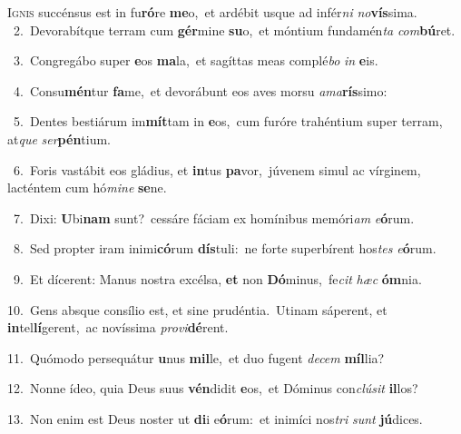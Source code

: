 \lettrine{\initial\textcolor{\initialcolor}{I}}{gnis} succénsus est in fu\-\textbf{ró}\-re \textbf{me}\-o,~\star et ardébit usque ad infér\textit{ni} \textit{no}\-\textbf{vís}sima.\\
{\numbfont\textcolor{\numbcolor}{~2.}}~Devorabítque terram cum \textbf{gér}\-mine \textbf{su}\-o,~\star et móntium fundamén\textit{ta} \textit{com}\-\textbf{bú}ret.\par
{\numbfont\textcolor{\numbcolor}{~3.}}~Congregábo super \textbf{e}\-os \textbf{ma}\-la,~\star et sagíttas meas complé\textit{bo} \textit{in} \textbf{e}\-is.\par
{\numbfont\textcolor{\numbcolor}{~4.}}~Consu\-\textbf{mén}\-tur \textbf{fa}\-me,~\star et devorábunt eos aves morsu \textit{a}\-\textit{ma}\textbf{rís}simo:\par
{\numbfont\textcolor{\numbcolor}{~5.}}~Dentes bestiárum im\-\textbf{mít}\-tam in \textbf{e}\-os,~\star cum furóre trahéntium super terram, at\textit{que} \textit{ser}\-\textbf{pén}tium.\par
{\numbfont\textcolor{\numbcolor}{~6.}}~Foris vastábit eos gládius, et \textbf{in}\-tus \textbf{pa}\-vor,~\star júvenem simul ac vírginem, lacténtem cum hó\-\textit{mi}\-\textit{ne} \textbf{se}\-ne.\par
{\numbfont\textcolor{\numbcolor}{~7.}}~Dixi: \textbf{U}\-bi\textbf{nam} sunt?~\star cessáre fáciam ex homínibus memóri\textit{am} \textit{e}\-\textbf{ó}rum.\par
{\numbfont\textcolor{\numbcolor}{~8.}}~Sed propter iram inimi\-\textbf{có}\-rum \textbf{dís}\-tuli:~\star ne forte superbírent hos\textit{tes} \textit{e}\-\textbf{ó}rum.\par
{\numbfont\textcolor{\numbcolor}{~9.}}~Et dícerent: Manus nostra excélsa, \textbf{et} non \textbf{Dó}\-minus,~\star fe\textit{cit} \textit{hæc} \textbf{óm}\-nia.\par
{\numbfont\textcolor{\numbcolor}{10.}}~Gens absque consílio est, et sine prudéntia.~\dagger Utinam sáperent, et \textbf{in}\-tel\-\textbf{lí}\-gerent,~\star ac novíssima \textit{pro}\-\textit{vi}\textbf{dé}rent.\par
{\numbfont\textcolor{\numbcolor}{11.}}~Quómodo persequátur \textbf{u}\-nus \textbf{mil}\-le,~\star et duo fugent \textit{de}\-\textit{cem} \textbf{míl}\-lia?\par
{\numbfont\textcolor{\numbcolor}{12.}}~Nonne ídeo, quia Deus suus \textbf{vén}\-didit \textbf{e}\-os,~\star et Dóminus con\-\textit{clú}\-\textit{sit} \textbf{il}\-los?\par
{\numbfont\textcolor{\numbcolor}{13.}}~Non enim est Deus noster ut \textbf{di}\-i e\-\textbf{ó}\-rum:~\star et inimíci nos\textit{tri} \textit{sunt} \textbf{jú}\-dices.\par
